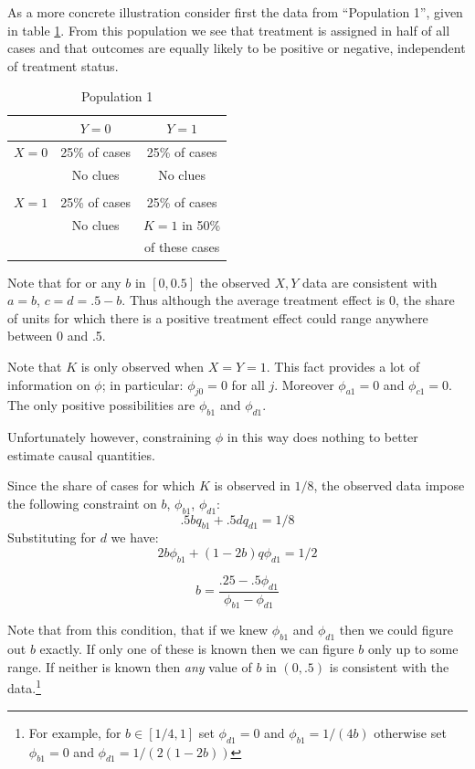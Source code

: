 \documentclass[12pt,]{book}
\let\rmarkdownfootnote\footnote%
\def\footnote{\protect\rmarkdownfootnote}
\begin{document}
As a more concrete illustration consider first the data from ``Population 1'', given in table \ref{S1}. From this population we see that treatment is assigned in half of all cases and that outcomes are equally likely to be positive or negative, independent of treatment status.

\begin{table}[h!]
\centering
\begin{tabular}{c|cc}
           &        $Y=0$ &        $Y=1$ \\ \hline
       $X=0$ &     25\% of cases &     25\% of cases  \\
             & No clues & No clues \\ \\
       $X=1$ &     25\% of cases &     25\% of cases  \\
             & No clues & $K=1$ in 50\% \\
             &  & of these cases\\
\end{tabular}  
\caption{Population 1}
\label{S1} 
\end{table}

Note that for or any \(b\) in \([0,0.5]\) the observed \(X,Y\) data are consistent with \(a = b\), \(c = d = .5 - b\). Thus although the average treatment effect is 0, the share of units for which there is a positive treatment effect could range anywhere between 0 and .5.

Note that \(K\) is only observed when \(X=Y = 1\). This fact provides a lot of information on \(\phi\); in particular:
\(\phi_{j0} = 0\) for all \(j\). Moreover \(\phi_{a1} = 0\) and \(\phi_{c1} = 0\). The only positive possibilities are \(\phi_{b1}\) and \(\phi_{d1}\).

Unfortunately however, constraining \(\phi\) in this way does nothing to better estimate causal quantities.

Since the share of cases for which \(K\) is observed in \(1/8\), the observed data impose the following constraint on \(b\), \(\phi_{b1}\), \(\phi_{d1}\):
\begin{equation}
.5b q_{b1}  + .5d q_{d1}  = 1/8 \label{C1}
\end{equation}
Substituting for \(d\) we have:
\[2b \phi_{b1} +(1-2b) q\phi_{d1} = 1/2\] \label{CC1}

\[b = \frac{.25 - .5\phi_{d1}}{\phi_{b1} - \phi_{d1}}\] \label{CC2}

Note that from this condition, that if we knew \(\phi_{b1}\) and \(\phi_{d1}\) then we could figure out \(b\) exactly.
If only one of these is known then we can figure \(b\) only up to some range. If neither is known then \emph{any} value of \(b\) in \((0,.5)\) is consistent with the data.\footnote{For example, for \(b \in [1/4,1]\) set \(\phi_{d1}=0\) and \(\phi_{b1} = 1/(4b)\) otherwise set \(\phi_{b1}=0\) and \(\phi_{d1} = 1/(2(1-2b))\)}
\end{document}

